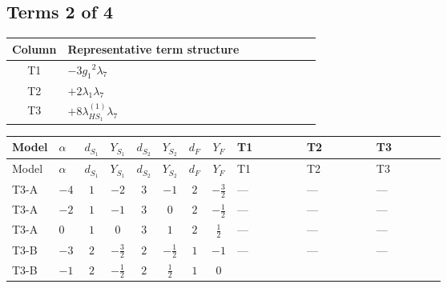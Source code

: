 \documentclass[8pt]{article}
\begin{document}
\begin{landscape}
\subsection*{Terms 2 of 4}
\begin{center}
\begin{tabular}{@{}c >{\raggedright\arraybackslash}p{0.82\linewidth}@{}}
\toprule
Column & Representative term structure \\
\midrule
T1 & \(\displaystyle -3 {g_1}^2 {\lambda_{7}}\) \\
\midrule
T2 & \(\displaystyle +2 {\lambda_1} {\lambda_{7}}\) \\
\midrule
T3 & \(\displaystyle +8 {\lambda_{HS_1}^{(1)}} {\lambda_{7}}\) \\
\midrule
\bottomrule
\end{tabular}
\end{center}
\smallskip
\tiny
\begin{longtable}{@{}llcccccc >{\raggedright\arraybackslash}p{0.21\linewidth} >{\raggedright\arraybackslash}p{0.21\linewidth} >{\raggedright\arraybackslash}p{0.21\linewidth}@{}}
\toprule
Model & $\alpha$ & $d_{S_1}$ & $Y_{S_1}$ & $d_{S_2}$ & $Y_{S_2}$ & $d_F$ & $Y_F$ & T1 & T2 & T3 \\
\midrule
\endfirsthead
\toprule
Model & $\alpha$ & $d_{S_1}$ & $Y_{S_1}$ & $d_{S_2}$ & $Y_{S_2}$ & $d_F$ & $Y_F$ & T1 & T2 & T3 \\
\midrule
\endhead
T3-A & $-4$ & $1$ & $-2$ & $3$ & $-1$ & $2$ & $-\frac{3}{2}$ & --- & --- & --- \\
\midrule
T3-A & $-2$ & $1$ & $-1$ & $3$ & $0$ & $2$ & $-\frac{1}{2}$ & --- & --- & --- \\
\midrule
T3-A & $0$ & $1$ & $0$ & $3$ & $1$ & $2$ & $\frac{1}{2}$ & --- & --- & --- \\
\midrule
T3-B & $-3$ & $2$ & $-\frac{3}{2}$ & $2$ & $-\frac{1}{2}$ & $1$ & $-1$ & --- & --- & --- \\
\midrule
T3-B & $-1$ & $2$ & $-\frac{1}{2}$ & $2$ & $\frac{1}{2}$ & $1$ & $0$ & \scriptsize\adjustbox{max width=\linewidth}{$\begin{gathered} -3 {g_1}^2 {\lambda_{7}}\end{gathered}$} & \scriptsize\adjustbox{max width=\linewidth}{$\begin{gathered} +2 {\lambda_1} {\lambda_{7}}\end{gathered}$} & \scriptsize\adjustbox{max width=\linewidth}{$\begin{gathered} +8 {\lambda_{HS_1}^{(1)}} {\lambda_{7}}\end{gathered}$} \\

\end{longtable}
\end{landscape}
\end{document}
